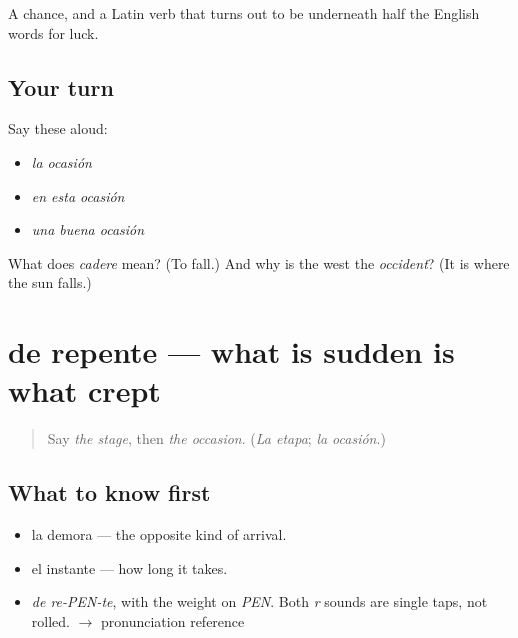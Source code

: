 \begin{grammarlens}[title={What you've built}]
A chance, and a Latin verb that turns out to be underneath half the English words for luck.
\end{grammarlens}

\subsection*{Your turn}
Say these aloud:

\begin{itemize}
\raggedright
  \item \emph{la ocasión}
  \item \emph{en esta ocasión}
  \item \emph{una buena ocasión}
\end{itemize}

\begin{tcolorbox}[breakable,colback=teal!4,colframe=teal!35!black,title={Before you move on}]
What does \emph{cadere} mean? (To fall.) And why is the west the \emph{occident}? (It is where the sun falls.)
\end{tcolorbox}
\section[de repente]{de repente — what is sudden is what crept}

\label{lesson:ES-C356-repente}



\begin{quote}
Say \emph{the stage}, then \emph{the occasion}. (\emph{La etapa}; \emph{la ocasión}.)
\end{quote}

\subsection*{What to know first}
\begin{itemize}
\raggedright
  \item la demora — the opposite kind of arrival.
  \item el instante — how long it takes.
\end{itemize}

\begin{sounds}
\begin{itemize}
\raggedright
  \item \emph{de re-PEN-te}, with the weight on \emph{PEN}. Both \emph{r} sounds are single taps, not rolled. $\to$ pronunciation reference
\end{itemize}
\end{sounds}

